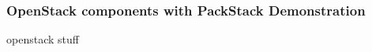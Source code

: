 \renewcommand{\imgpath}{legacy/old-cloud/img}

\subsubsection{OpenStack components with PackStack Demonstration}
openstack stuff

